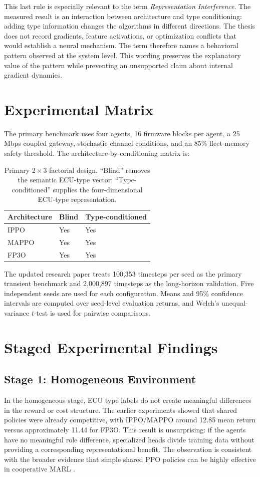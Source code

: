 \documentclass{iutbscthesis}
\begin{document}
This last rule is especially relevant to the term \emph{Representation Interference}. The measured result is an interaction between architecture and type conditioning: adding type information changes the algorithms in different directions. The thesis does not record gradients, feature activations, or optimization conflicts that would establish a neural mechanism. The term therefore names a behavioral pattern observed at the system level. This wording preserves the explanatory value of the pattern while preventing an unsupported claim about internal gradient dynamics.

\section{Experimental Matrix}
The primary benchmark uses four agents, 16 firmware blocks per agent, a 25 Mbps coupled gateway, stochastic channel conditions, and an 85\% fleet-memory safety threshold. The architecture-by-conditioning matrix is:
\begin{table}[H]
\centering
\small
\begin{tabular}{lll}
\toprule
Architecture & Blind & Type-conditioned\\
\midrule
IPPO & Yes & Yes\\
MAPPO & Yes & Yes\\
FP3O & Yes & Yes\\
\bottomrule
\end{tabular}
\caption{Primary $2\times3$ factorial design. ``Blind'' removes the semantic ECU-type vector; ``Type-conditioned'' supplies the four-dimensional ECU-type representation.}
\label{tab:matrix}
\end{table}

The updated research paper treats 100,353 timesteps per seed as the primary transient benchmark and 2,000,897 timesteps as the long-horizon validation. Five independent seeds are used for each configuration. Means and 95\% confidence intervals are computed over seed-level evaluation returns, and Welch's unequal-variance $t$-test is used for pairwise comparisons.

\section{Staged Experimental Findings}

\subsection{Stage 1: Homogeneous Environment}
In the homogeneous stage, ECU type labels do not create meaningful differences in the reward or cost structure. The earlier experiments showed that shared policies were already competitive, with IPPO/MAPPO around 12.85 mean return versus approximately 11.44 for FP3O. This result is unsurprising: if the agents have no meaningful role difference, specialized heads divide training data without providing a corresponding representational benefit. The observation is consistent with the broader evidence that simple shared PPO policies can be highly effective in cooperative MARL \parencite{yu2022surprising}.
\end{document}
